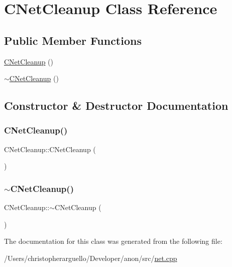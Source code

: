\hypertarget{class_c_net_cleanup}{}\section{C\+Net\+Cleanup Class Reference}
\label{class_c_net_cleanup}
\subsection*{Public Member Functions}
\begin{DoxyCompactItemize}
\item 
\mbox{\hyperlink{class_c_net_cleanup_a928d536c21f6190defda6d6ea2726347}{C\+Net\+Cleanup}} ()
\item 
\mbox{\hyperlink{class_c_net_cleanup_a29b59094c7697b45ca6d13424012506b}{$\sim$\+C\+Net\+Cleanup}} ()
\end{DoxyCompactItemize}


\subsection{Constructor \& Destructor Documentation}
\mbox{\label{class_c_net_cleanup_a928d536c21f6190defda6d6ea2726347}} 
\subsubsection{\texorpdfstring{C\+Net\+Cleanup()}{CNetCleanup()}}
{\footnotesize\ttfamily C\+Net\+Cleanup\+::\+C\+Net\+Cleanup (\begin{DoxyParamCaption}{ }\end{DoxyParamCaption})\hspace{0.3cm}{\ttfamily [inline]}}

\mbox{\label{class_c_net_cleanup_a29b59094c7697b45ca6d13424012506b}} 
\subsubsection{\texorpdfstring{$\sim$\+C\+Net\+Cleanup()}{~CNetCleanup()}}
{\footnotesize\ttfamily C\+Net\+Cleanup\+::$\sim$\+C\+Net\+Cleanup (\begin{DoxyParamCaption}{ }\end{DoxyParamCaption})\hspace{0.3cm}{\ttfamily [inline]}}



The documentation for this class was generated from the following file\+:\begin{DoxyCompactItemize}
\item 
/\+Users/christopherarguello/\+Developer/anon/src/\mbox{\hyperlink{net_8cpp}{net.\+cpp}}\end{DoxyCompactItemize}
